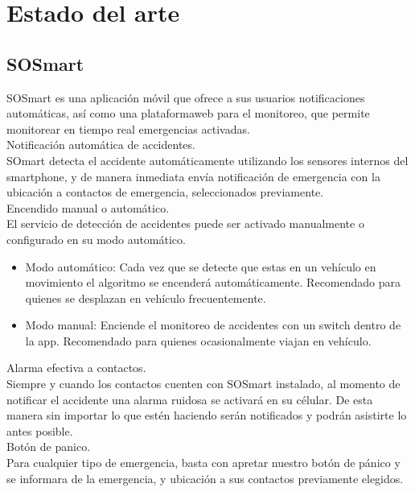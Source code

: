\section{Estado del arte}

\subsection{SOSmart}
SOSmart es una aplicación móvil que ofrece a sus usuarios notificaciones automáticas, así como una plataformaweb para el monitoreo, que permite monitorear en tiempo real emergencias activadas.\\

Notificación automática de accidentes.\\
SOmart detecta el accidente automáticamente utilizando los sensores internos del smartphone, y de manera inmediata envía notificación de emergencia con la ubicación a contactos de emergencia, seleccionados previamente.\\

Encendido manual o automático.\\
El servicio de detección de accidentes puede ser activado manualmente o configurado en su modo automático.
\begin{itemize}
	\item Modo automático: Cada vez que se detecte que estas en un vehículo en movimiento el algoritmo se encenderá automáticamente. Recomendado para quienes se desplazan en vehículo frecuentemente.
	
	\item Modo manual: Enciende el monitoreo de accidentes con un switch dentro de la app. Recomendado para quienes ocasionalmente viajan en vehículo.\\
\end{itemize}


Alarma efectiva a contactos.\\
Siempre y cuando los contactos cuenten con SOSmart instalado, al momento de notificar el accidente una alarma ruidosa se activará en su célular. De esta manera sin importar lo que estén haciendo serán notificados y podrán asistirte lo antes posible.\\

Botón de panico.\\
Para cualquier tipo de emergencia, basta con apretar nuestro botón de pánico y se informara de la emergencia, y ubicación a sus contactos previamente elegidos.\\


